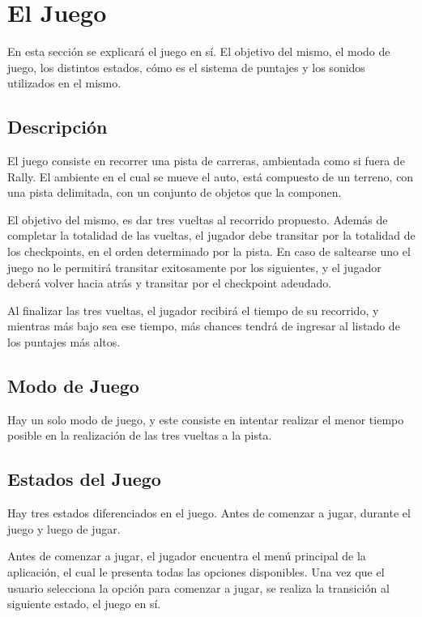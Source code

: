 \documentclass[a4paper,11pt]{article}
\begin{document}
\section{El Juego}
\label{el_juego}

En esta sección se explicará el juego en sí.  El objetivo del mismo, el modo de
juego, los distintos estados, cómo es el sistema de puntajes y los sonidos
utilizados en el mismo.

\subsection{Descripción}
El juego consiste en recorrer una pista de carreras, ambientada como si fuera
de Rally.  El ambiente en el cual se mueve el auto, está compuesto de un
terreno, con una pista delimitada, con un conjunto de objetos que la componen.

El objetivo del mismo, es dar tres vueltas al recorrido propuesto.  Además de
completar la totalidad de las vueltas, el jugador debe transitar por la
totalidad de los checkpoints, en el orden determinado por la pista.  En caso de
saltearse uno el juego no le permitirá transitar exitosamente por los
siguientes, y el jugador deberá volver hacia atrás y transitar por el
checkpoint adeudado.

Al finalizar las tres vueltas, el jugador recibirá el tiempo de su recorrido, y
mientras más bajo sea ese tiempo, más chances tendrá de ingresar al listado de
los puntajes más altos.
\subsection{Modo de Juego}
Hay un solo modo de juego, y este consiste en intentar realizar el menor tiempo
posible en la realización de las tres vueltas a la pista.
\subsection{Estados del Juego}
Hay tres estados diferenciados en el juego.  Antes de comenzar a jugar, durante
el juego y luego de jugar.

Antes de comenzar a jugar, el jugador encuentra el menú principal de la
aplicación, el cual le presenta todas las opciones disponibles.  Una vez que el
usuario selecciona la opción para comenzar a jugar, se realiza la transición al
siguiente estado, el juego en sí.
\end{document}
